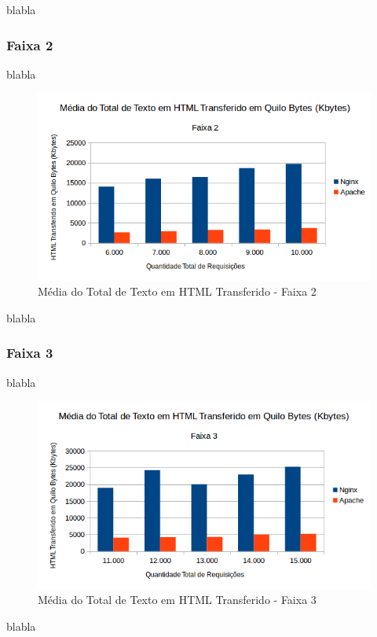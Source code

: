blabla

\subsubsection{Faixa 2}
blabla

\begin{figure}[htb]
	\centering
	\includegraphics[width=0.6\linewidth]{graficos/grafico3-f2} 
	\caption{Média do Total de Texto em HTML Transferido - Faixa 2}
	\label{fig:grafico3-f2}
\end{figure}
blabla

\subsubsection{Faixa 3}
blabla

\begin{figure}[htb]
	\centering
	\includegraphics[width=0.6\linewidth]{graficos/grafico3-f3} 
	\caption{Média do Total de Texto em HTML Transferido - Faixa 3}
	\label{fig:grafico3-f3}
\end{figure}
blabla
